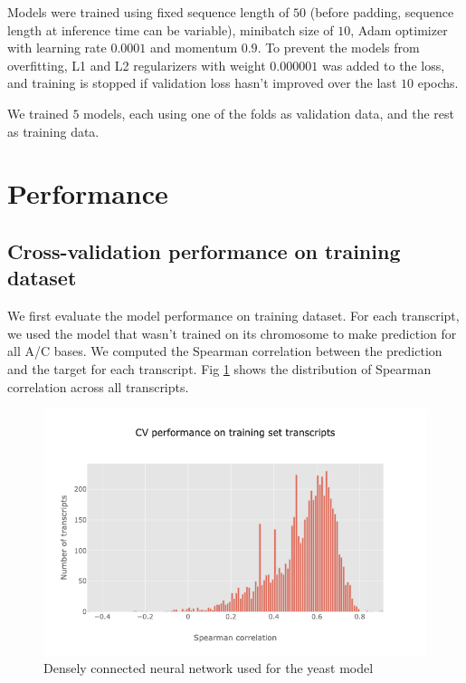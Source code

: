 \documentclass{proposal}
\begin{document}
Models were trained using fixed sequence length of $50$ (before padding, sequence length at inference time can be variable),
minibatch size of $10$, Adam optimizer with learning rate $0.0001$ and momentum $0.9$.
To prevent the models from overfitting, L1 and L2 regularizers with weight $0.000001$ was added to the loss,
and training is stopped if validation loss hasn't improved over the last $10$ epochs.

We trained $5$ models, each using one of the folds as validation data, and the rest as training data.


\section{Performance}


\subsection{Cross-validation performance on training dataset}

We first evaluate the model performance on training dataset.
For each transcript, we used the model that wasn't trained on its chromosome to make prediction for all A/C bases.
We computed the Spearman correlation between the prediction and the target for each transcript.
Fig \ref{fig:yeast_cv_performance} shows the distribution of Spearman correlation across all transcripts.

\begin{figure}
\includegraphics[width=\textwidth]{yeast_cv_performance.png}
\caption{Densely connected neural network used for the yeast model}
\label{fig:yeast_cv_performance}
\centering
\end{figure}
\end{document}
